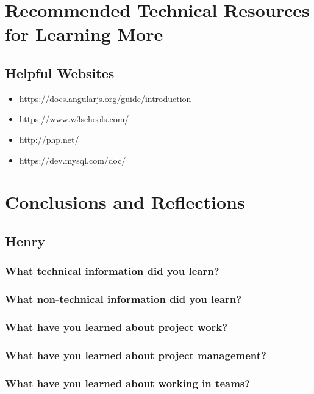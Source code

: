 \documentclass[onecolumn, draftclsnofoot,10pt, compsoc]{IEEEtran}
\begin{document}
\newpage
\section{Recommended Technical Resources for Learning More}
\subsection {Helpful Websites}
\begin{itemize}
\item https://docs.angularjs.org/guide/introduction
\item https://www.w3schools.com/
\item http://php.net/
\item https://dev.mysql.com/doc/
\end{itemize}

\newpage
\section{Conclusions and Reflections}

\subsection{Henry}

\subsubsection{What technical information did you learn?}

\subsubsection{What non-technical information did you learn?}

\subsubsection{What have you learned about project work?}

\subsubsection{What have you learned about project management?}

\subsubsection{What have you learned about working in teams?}
\end{document}
